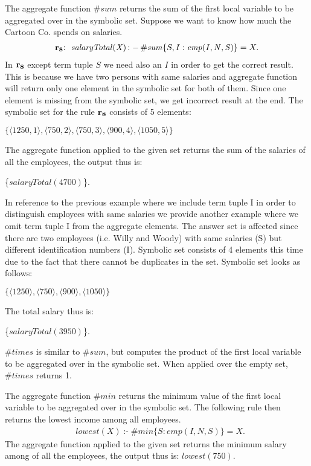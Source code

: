 \documentclass[a4paper, titlepage]{article}
\DeclareMathOperator{\leftimpl}{:-}
\newcommand\mycenterline[1]{\par\smallskip\centerline{#1} \smallskip}
\newcommand{\row}[1]{%
  \ensuremath{\color{black}\ensuremath{\mathbf{#1}} \color{black}}%
}
\newcommand{\rowprefix}[1]{%
  \ensuremath{\color{black}\mathbf{#1{:}}\ }%
}
\begin{document}
The aggregate function $\mathit{\#sum}$ returns the 
sum of the first local variable to be aggregated over in 
the symbolic set. Suppose we want to know how much the 
Cartoon Co. spends on salaries.
\begin{align*}
\mathit{\rowprefix{r_8} \ salaryTotal(X)} \leftimpl \mathit{\#sum}\{S,I : 
\mathit{emp(I,N,S)}\} = X.
\end{align*}
In $\row{r_8}$ except term tuple $S$ we need also an $I$ in order to get the correct result. This is because we have two persons with same salaries and aggregate function will return only one element in the symbolic set for both of them. Since one element is missing from the symbolic set, we get incorrect result at the end.  
The symbolic set for the rule $\row{r_8}$ consists of 5 elements:\\ 
\mycenterline{$\{ \langle 1250,1 \rangle, \langle 750,2 \rangle, \langle 750,3 \rangle, \langle 900,4 \rangle, \langle 1050,5 \rangle\}$} 
The 
aggregate function applied to the given set returns the sum 
of the salaries of all the employees, the output thus is: 
\\ \mycenterline{
\{$\mathit{salaryTotal(4700)}$\}.} 
In reference to the previous example where we include term tuple I in order to distinguish employees with same salaries we 
provide another example where we omit term tuple I  from the aggregate elements. The answer set is affected since
there are two employees (i.e. Willy and Woody) with same salaries (S) but different identification numbers (I).
Symbolic set consists of 4 elements this time due to the fact that there cannot be duplicates in the set. Symbolic set looks as follows:
\\ \mycenterline{$\{ \langle 1250 \rangle, \langle 750 \rangle, \langle 900 \rangle,  \langle 1050 \rangle\}$}
The total salary thus is:
\\ \mycenterline{
\{$\mathit{salaryTotal(3950)}$\}.} 
 
$\mathit{\#times}$ is 
similar to $\mathit{\#sum}$, but computes the product of 
the first local variable to be aggregated over in the 
symbolic set. When applied over the empty set, 
$\mathit{\#times}$ returns 1.

The aggregate function $\mathit{\#min}$ returns 
the minimum value of the first local variable to be 
aggregated over in the symbolic set. The following rule then returns the lowest income among all employees.
\begin{align*}
& lowest(X) \leftimpl \#min\{S : emp(I,N,S)\} = X.
\end{align*}
The aggregate function applied to the given set returns the 
minimum salary among of all the employees, the output thus 
is:
{$\mathit{lowest(750)}$}.
\end{document}
